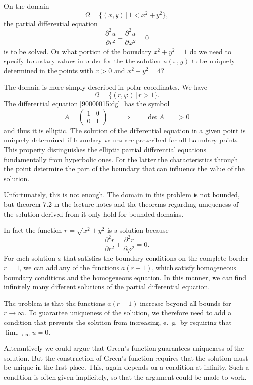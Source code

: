 On the domain
\[
\Omega = \{ (x,y)\,|\, 1 < x^2 + y^2\},
\]
the partial differential equation
\begin{equation}
\frac{\partial^2 u}{\partial r^2}
+
\frac{\partial^2 u}{\partial \varphi^2}
=
0
\label{90000015:dgl}
\end{equation}
is to be solved.
On what portion of the boundary
$x^2 +y^2 = 1$
do we need to specify boundary values in order for the the solution $u(x,y)$
to be uniquely determined in the points with $x>0$ and $x^2 + y^2 = 4$?

\begin{loesung}
The domain is more simply described in polar coordinates.
We have
\[
\Omega = \{ (r,\varphi)\,|\, r>1\}.
\]
The differential equation \eqref{90000015:dgl} has the symbol
\[
A
=
\begin{pmatrix}
1&0\\
0&1
\end{pmatrix}
\qquad\Rightarrow\qquad
\det A=1>0
\]
and thus it is elliptic.
The solution of the differential equation in a given point is uniquely
determined if boundary values are prescribed for all boundary points.
This property distinguishes the elliptic partial differential equations
fundamentally from hyperbolic ones.
For the latter the characteristics through the point determine the
part of the boundary that can influence the value of the solution.

Unfortunately, this is not enough.
The domain in this problem is not bounded, but theorem 7.2 in the
lecture notes and the theorems regarding uniqueness of the solution
derived from it only hold for bounded domains.

In fact the function $r=\sqrt{x^2+y^2}$ is a solution because
\[
\frac{\partial^2 r}{\partial r^2} + \frac{\partial^2 r}{\partial \varphi^2}=0.
\]
For each solution $u$ that satisfies the boundary conditions on
the complete border $r=1$, we can add any of the functions $a(r-1)$, which
satisfy homogeneous boundary conditions and the homogeneous equation.
In this manner, we can find infinitely many different solutions
of the partial differential equation.

The problem is that the functions $a(r-1)$ increase beyond all bounds
for $r\to\infty$.
To guarantee uniqueness of the solution, we therefore need to add a
condition that prevents the solution from increasing, e.~g.~by requiring
that $\lim_{r\to\infty}u=0$.

Alterantively we could argue that Green's function guarantees uniqueness
of the solution.
But the construction of Green's function requires that the solution must
be unique in the first place.
This, again depends on a condition at infinity.
Such a condition is often given implicitely, so that the argument
could be made to work.


\end{loesung}
